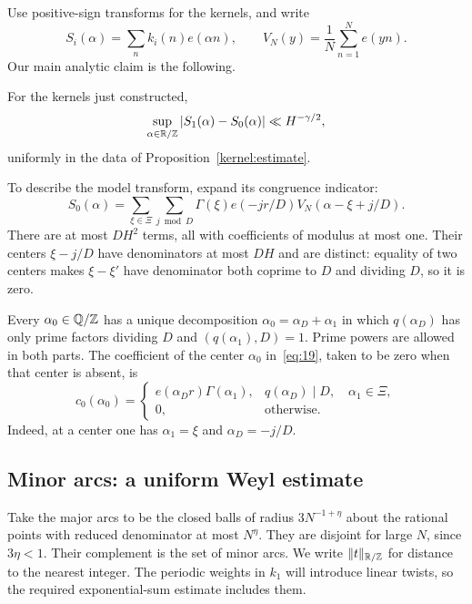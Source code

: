 Use positive-sign transforms for the kernels, and write
\[
 S_i(\alpha)=\sum_n k_i(n)e(\alpha n),\qquad
 V_N(y)=\frac1N\sum_{n=1}^N e(yn).
\]
Our main analytic claim is the following.

\begin{lemma}
\label{kernel:comparison}
For the kernels just constructed,
\begin{equation}
 \sup_{\alpha\in\mathbb R/\mathbb Z}|S_1(\alpha)-S_0(\alpha)|
       \ll H^{-\gamma/2},
 \label{eq:18}
\end{equation}
uniformly in the data of Proposition~\ref{kernel:estimate}.
\end{lemma}

To describe the model transform, expand its congruence indicator:
\begin{equation}
 S_0(\alpha)=\sum_{\xi\in\Xi}\sum_{j\bmod D}
           \Gamma(\xi)e(-jr/D)V_N(\alpha-\xi+j/D).
 \label{eq:19}
\end{equation}
There are at most $DH^2$ terms, all with coefficients of modulus at
most one. Their centers $\xi-j/D$ have denominators at most $DH$ and
are distinct: equality of two centers makes $\xi-\xi'$ have denominator
both coprime to $D$ and dividing $D$, so it is zero.

Every $\alpha_0\in\mathbb Q/\mathbb Z$ has a unique decomposition
$\alpha_0=\alpha_D+\alpha_1$ in which $q(\alpha_D)$ has only prime
factors dividing $D$ and $(q(\alpha_1),D)=1$. Prime powers are allowed
in both parts. The coefficient of the center $\alpha_0$ in~\eqref{eq:19},
taken to be zero when that center is absent, is
\begin{equation}
 c_0(\alpha_0)=
 \begin{cases}
 e(\alpha_Dr)\Gamma(\alpha_1),&q(\alpha_D)\mid D,
                                      \quad\alpha_1\in\Xi,\\
 0,&\text{otherwise}.
 \end{cases}
 \label{eq:20}
\end{equation}
Indeed, at a center one has $\alpha_1=\xi$ and $\alpha_D=-j/D$.

\subsection{Minor arcs: a uniform Weyl estimate}

Take the major arcs to be the closed balls of radius $3N^{-1+\eta}$
about the rational points with reduced denominator at most $N^\eta$.
They are disjoint for large $N$, since $3\eta<1$. Their complement
is the set of minor arcs. We write $\|t\|_{\mathbb R/\mathbb Z}$ for distance to
the nearest integer. The periodic weights in $k_1$ will introduce
linear twists, so the required exponential-sum estimate includes them.

